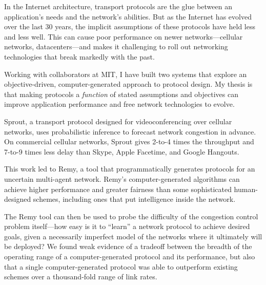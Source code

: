 % 
% 
%
In the Internet architecture, transport protocols are the glue between
an application's needs and the network's abilities. But as the
Internet has evolved over the last 30 years, the implicit assumptions
of these protocols have held less and less well. This can cause poor
performance on newer networks---cellular networks, datacenters---and
makes it challenging to roll out networking technologies that break
markedly with the past.

Working with collaborators at MIT, I have built two systems that
explore an objective-driven, computer-generated approach to protocol
design. My thesis is that making protocols a \emph{function} of stated
assumptions and objectives can improve application performance and
free network technologies to evolve.

Sprout, a transport protocol designed for videoconferencing over
cellular networks, uses probabilistic inference to forecast network
congestion in advance. On commercial cellular networks, Sprout gives
2-to-4 times the throughput and 7-to-9 times less delay than Skype,
Apple Facetime, and Google Hangouts.

This work led to Remy, a tool that programmatically generates
protocols for an uncertain multi-agent network. Remy's
computer-generated algorithms can achieve higher performance and
greater fairness than some sophisticated human-designed schemes,
including ones that put intelligence inside the network.

The Remy tool can then be used to probe the difficulty of the
congestion control problem itself---how easy is it to ``learn'' a
network protocol to achieve desired goals, given a necessarily
imperfect model of the networks where it ultimately will be deployed?
We found weak evidence of a tradeoff between the breadth of the
operating range of a computer-generated protocol and its performance,
but also that a single computer-generated protocol was able to
outperform existing schemes over a thousand-fold range of link rates.

